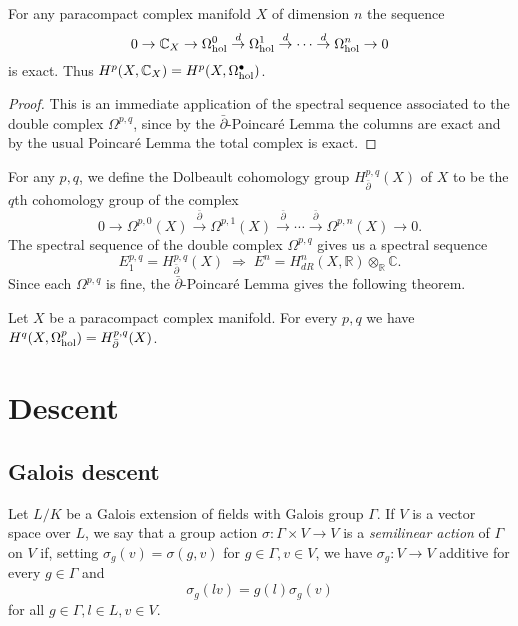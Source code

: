 \begin{cor} For any paracompact complex manifold $X$ of dimension $n$ the sequence
\[
0 \rightarrow \mathbb{C}_X \rightarrow \Omega^0_{\rm hol} \stackrel{d}{\rightarrow} \Omega^1_{\rm hol} \stackrel{d}{\rightarrow} \cdots \stackrel{d}{\rightarrow} \Omega^n_{\rm hol} \rightarrow 0
\]
is exact. Thus $H^p(X,\mathbb{C}_X) = H^p(X,\Omega^\bullet_{\rm hol})$.
\end{cor}
\begin{proof} This is an immediate application of the spectral sequence associated to the double complex $\Omega^{p,q}$, since by the $\bar\partial$-Poincar\'{e} Lemma the columns are exact and by the usual Poincar\'{e} Lemma the total complex is exact.
\end{proof}

For any $p,q$, we define the Dolbeault cohomology group $H^{p,q}_{\bar\partial}(X)$ of $X$ to be the $q$th cohomology group of the complex
\[
0 \rightarrow \Omega^{p,0}(X) \stackrel{\bar\partial}{\rightarrow} \Omega^{p,1}(X) \stackrel{\bar\partial}{\rightarrow} \cdots \stackrel{\bar\partial}{\rightarrow} \Omega^{p,n}(X) \rightarrow 0.
\]
The spectral sequence of the double complex $\Omega^{p,q}$ gives us a spectral sequence
\[
E^{p,q}_1 = H^{p,q}_{\bar\partial}(X) \; \Rightarrow \; E^n = H^n_{dR}(X,\mathbb{R}) \otimes_\mathbb{R} \mathbb{C}.
\]
Since each $\Omega^{p,q}$ is fine, the $\bar\partial$-Poincar\'{e} Lemma gives the following theorem.

\begin{thm}[Dolbeault] Let $X$ be a paracompact complex manifold. For every $p,q$ we have $H^q(X,\Omega^p_{\rm hol}) = H^{p,q}_{\bar\partial}(X)$.
\end{thm}


\section{Descent}

\subsection{Galois descent}

Let $L/K$ be a Galois extension of fields with Galois group $\Gamma$. If $V$ is a vector space over $L$, we say that a group action $\sigma:\Gamma\times V\rightarrow V$ is a \emph{semilinear action} of $\Gamma$ on $V$ if, setting $\sigma_g(v) = \sigma(g,v)$ for $g \in \Gamma, v\in V$, we have $\sigma_g : V \rightarrow V$ additive for every $g \in \Gamma$ and
\[
\sigma_g(lv) = g(l)\sigma_g(v)
\]
for all $g\in \Gamma, l \in L, v \in V$.

